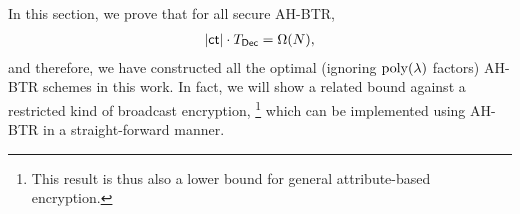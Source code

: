 In this section, we prove that for all secure AH-BTR,
\begin{align*}
|\ct|\cdot\TDec=\bigOmega(N),
\end{align*}
and therefore, we have constructed all the optimal (ignoring $\operatorname{poly}(\lambda)$ factors) AH-BTR schemes in this work.
In fact, we will show a related bound against a restricted kind of broadcast encryption,%
\footnote{This result is thus also a lower bound for general attribute-based encryption.}
which can be implemented using AH-BTR in a straight-forward manner.
